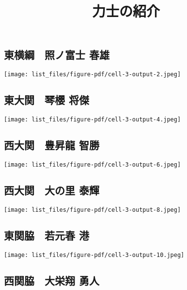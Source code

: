 \documentclass[
]{bxjsarticle}
\title{力士の紹介}
\author{}
\date{}
\begin{document}
\maketitle


\subsection{東横綱　照ノ富士
春雄}\label{ux6771ux6a2aux7db1-ux7167ux30ceux5bccux58eb-ux6625ux96c4}

\texttt{[image: list\_files/figure-pdf/cell-3-output-2.jpeg]}

\subsection{東大関　琴櫻
将傑}\label{ux6771ux5927ux95a2-ux7434ux6afb-ux5c06ux5091}

\texttt{[image: list\_files/figure-pdf/cell-3-output-4.jpeg]}

\subsection{西大関　豊昇龍
智勝}\label{ux897fux5927ux95a2-ux8c4aux6607ux9f8d-ux667aux52dd}

\texttt{[image: list\_files/figure-pdf/cell-3-output-6.jpeg]}

\subsection{西大関　大の里
泰輝}\label{ux897fux5927ux95a2-ux5927ux306eux91cc-ux6cf0ux8f1d}

\texttt{[image: list\_files/figure-pdf/cell-3-output-8.jpeg]}

\subsection{東関脇　若元春
港}\label{ux6771ux95a2ux8107-ux82e5ux5143ux6625-ux6e2f}

\texttt{[image: list\_files/figure-pdf/cell-3-output-10.jpeg]}

\subsection{西関脇　大栄翔
勇人}\label{ux897fux95a2ux8107-ux5927ux6804ux7fd4-ux52c7ux4eba}
\end{document}
